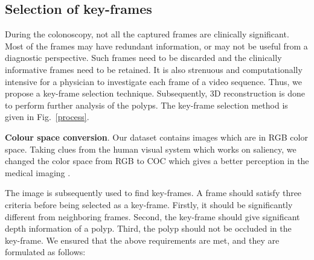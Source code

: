 \documentclass[journal]{IEEEtran}
\begin{document}
\subsection{Selection of key-frames}
During the colonoscopy, not all the captured frames are clinically significant. Most of the frames may have redundant information, or may not be useful from a diagnostic perspective. Such frames need to be discarded and the clinically informative frames need to be retained. 
It is also strenuous and computationally intensive for a physician to investigate each frame of a video sequence. 
Thus, we propose a key-frame selection technique. Subsequently, 3D reconstruction is done to perform further analysis of the polyps. The key-frame selection method is given in Fig.~\ref{process}.

\textbf{Colour space conversion}. Our dataset contains images which are in RGB color space. Taking clues from the human visual system which works on saliency, we changed the color space from RGB to COC which gives a better perception in the medical imaging \cite{engel1997colour}.
%
%


The image is subsequently used to find key-frames. A frame should satisfy three criteria before being selected as a key-frame. Firstly, it should be significantly different from neighboring frames. Second, the key-frame should give significant depth information of a polyp. Third, the polyp should not be occluded in the key-frame. We ensured that the above requirements are met, and they are formulated as follows:
\end{document}
